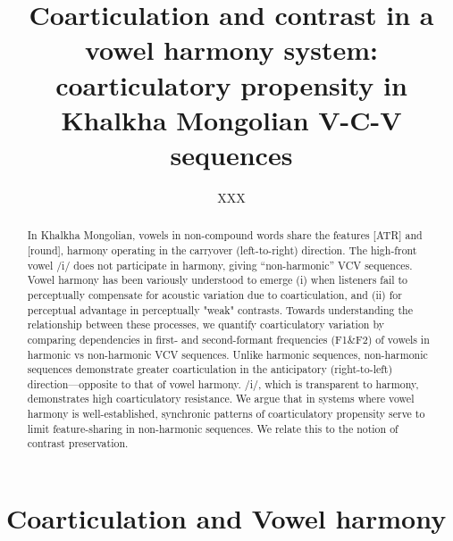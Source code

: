 \documentclass[a4paper,11pt,twocolumn]{article}
\title{Coarticulation and contrast in a vowel harmony system: coarticulatory propensity in Khalkha Mongolian V-C-V sequences}
\author{XXX}
\begin{document}
	
	\maketitle
	
	\begin{abstract}
		In Khalkha Mongolian, vowels in non-compound words share the features [ATR] and [round], harmony operating in the carryover (left-to-right) direction. The high-front vowel /i/ does not participate in harmony, giving ``non-harmonic'' VCV sequences. Vowel harmony has been variously understood to emerge (i) when listeners fail to perceptually compensate for acoustic variation due to coarticulation, and (ii) for perceptual advantage in perceptually "weak" contrasts. Towards understanding the relationship between these processes, we quantify coarticulatory variation by comparing dependencies in first- and second-formant frequencies (F1\&F2) of vowels in harmonic vs non-harmonic VCV sequences. Unlike harmonic sequences, non-harmonic sequences demonstrate greater coarticulation in the anticipatory (right-to-left) direction---opposite to that of vowel harmony. /i/, which is transparent to harmony, demonstrates high coarticulatory resistance. We argue that in systems where vowel harmony is well-established, synchronic patterns of coarticulatory propensity serve to limit feature-sharing in non-harmonic sequences. We relate this to the notion of contrast preservation.
	\end{abstract}
	
	
	
	\section{Coarticulation and Vowel harmony}
	
\end{document}

